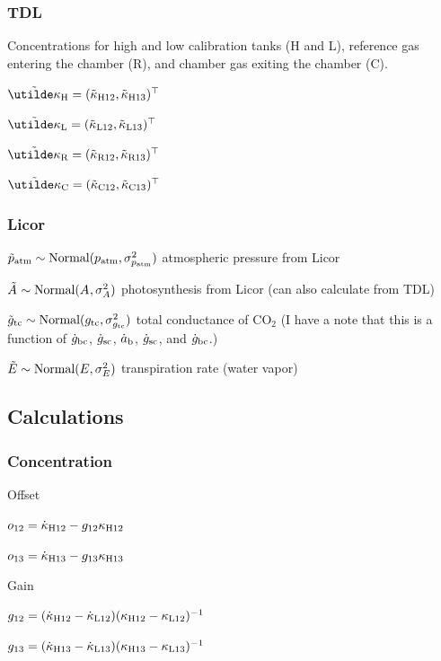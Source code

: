 \subsubsection{TDL}

Concentrations for high and low calibration tanks (H and L),
  reference gas entering the chamber (R),
  and chamber gas exiting the chamber (C).

$\vdatakappaH = (\sdatakappaHtw,\sdatakappaHth)^\transpose$

$\vdatakappaL = (\sdatakappaLtw,\sdatakappaLth)^\transpose$

$\vdatakappaR = (\sdatakappaRtw,\sdatakappaRth)^\transpose$

$\vdatakappaC = (\sdatakappaCtw,\sdatakappaCth)^\transpose$


\subsubsection{Licor}

$\tilde{p}_{\textrm{atm}} \sim \textrm{Normal}(p_{\textrm{atm}},\sigma_{p_{\textrm{atm}}}^2)$ atmospheric pressure from Licor

$\tilde{A}_{} \sim \textrm{Normal}(A_{}, \sigma_{A}^2)$ photosynthesis from Licor (can also calculate from TDL)

$\tilde{g}_{\textrm{tc}} \sim \textrm{Normal}(g_{\textrm{tc}}, \sigma_{g_{\textrm{tc}}}^2)$ total conductance of CO$_2$
  (I have a note that this is a function of $\dot{g}_{\textrm{bc}}$, $\dot{g}_{\textrm{sc}}$, $\dot{a}_{\textrm{b}}$, $\dot{g}_{\textrm{sc}}$, and $\dot{g}_{\textrm{bc}}$.)

$\tilde{E}_{} \sim \textrm{Normal}(E_{}, \sigma_{E}^2)$ transpiration rate (water vapor)


\subsection{Calculations}

\subsubsection{Concentration}

\noindent
Offset

$o_{\textrm{12}} = \dot{\kappa}_{\textrm{H}12} - g_{\textrm{12}}\kappa_{\textrm{H}12}$

$o_{\textrm{13}} = \dot{\kappa}_{\textrm{H}13} - g_{\textrm{13}}\kappa_{\textrm{H}13}$

\noindent
Gain

$g_{\textrm{12}} = (\dot{\kappa}_{\textrm{H}12} - \dot{\kappa}_{\textrm{L}12})(\kappa_{\textrm{H}12} - \kappa_{\textrm{L}12})^{-1}$

$g_{\textrm{13}} = (\dot{\kappa}_{\textrm{H}13} - \dot{\kappa}_{\textrm{L}13})(\kappa_{\textrm{H}13} - \kappa_{\textrm{L}13})^{-1}$

